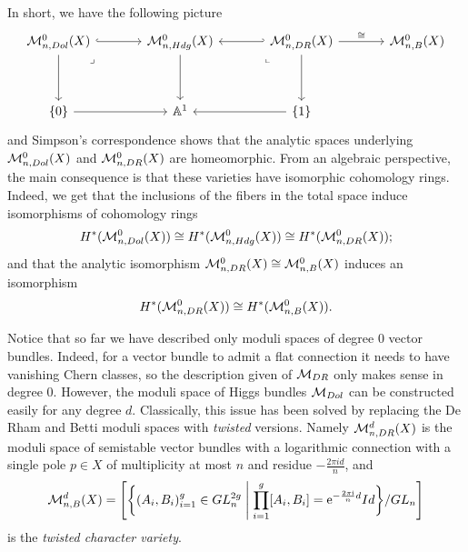 \documentclass{article}
\begin{document}
In short, we have the following picture
\begin{equation} \label{eq: pullback diagram}
    \begin{tikzcd}[ampersand replacement=\&, column sep=large, row sep=huge, baseline=(current bounding box.center)]
        {\mc{M}_{n, Dol}^0(X)} \& {\mc{M}_{n,Hdg}^0(X)} \& {\mc{M}_{n, DR}^0(X)} \& {\mc{M}_{n,B}^0(X)} \\
        {\{ 0 \}} \& {\Ab^1} \& {\{ 1 \}} 
        \arrow[hook, from=1-1, to=1-2]
        \arrow[from=1-1, to=2-1]
        \arrow["\lrcorner"{anchor=center, pos=0.125}, draw=none, from=1-1, to=2-2]
        \arrow[from=1-2, to=2-2]
        \arrow[hook', from=1-3, to=1-2]
        \arrow["\cong", from=1-3, to=1-4]
        \arrow["\lrcorner"{anchor=center, pos=0.125, rotate=-90}, draw=none, from=1-3, to=2-2]
        \arrow[from=1-3, to=2-3]
        \arrow[from=2-1, to=2-2]
        \arrow[from=2-3, to=2-2]
    \end{tikzcd}
\end{equation}
and Simpson's correspondence shows that the analytic spaces underlying $\mathcal{M}_{n, Dol}^0(X)$ and $\mathcal{M}_{n, DR}^0(X)$ are homeomorphic. From an algebraic perspective, the main consequence is that these varieties have isomorphic cohomology rings. Indeed, we get that the inclusions of the fibers in the total space induce isomorphisms of cohomology rings
\begin{equation}
H^*(\mathcal{M}_{n, Dol}^0(X)) \cong H^*(\mathcal{M}_{n,Hdg}^0(X)) \cong H^*(\mathcal{M}_{n, DR}^0(X));
\end{equation}
and that the analytic isomorphism $\mathcal{M}_{n, DR}^0(X) \cong \mathcal{M}_{n,B}^0(X)$ induces an isomorphism
\begin{equation}
H^*(\mathcal{M}_{n, DR}^0(X)) \cong H^*(\mathcal{M}_{n,B}^0(X)).
\end{equation}

Notice that so far we have described only moduli spaces of degree $0$ vector bundles. Indeed, for a vector bundle to admit a flat connection it needs to have vanishing Chern classes, so the description given of $\mathcal{M}_{DR}$ only makes sense in degree $0$. However, the moduli space of Higgs bundles $\mathcal{M}_{Dol}$ can be constructed easily for any degree $d$. Classically, this issue has been solved by replacing the De Rham and Betti moduli spaces with \textit{twisted} versions. Namely
$\mathcal{M}_{n, DR}^d(X)$
is the moduli space of semistable vector bundles with a logarithmic connection with a single pole $p \in X$ of multiplicity at most $n$ and residue $- \tfrac{2 \pi i d}{n}$, and
\begin{equation} \label{eq: twisted betti}
\mathcal{M}_{n, B}^d(X) = \left[ \bigg\{ (A_i, B_i)_{i = 1}^g \in GL_n^{2g} \;\middle|\; \prod_{i=1}^{g}[A_i, B_i] = \mathrm{e}^{-\frac{2 \pi \mathrm{i}}{n} d} Id \bigg\} / GL_n \right]
\end{equation}
is the \textit{twisted character variety}.
\end{document}
